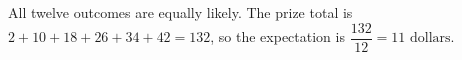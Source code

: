 All twelve outcomes are equally likely. The prize total is $2+10+18+26+34+42=132$, so the expectation is $\dfrac{132}{12}=\boxed{11\text{ dollars}}$.
